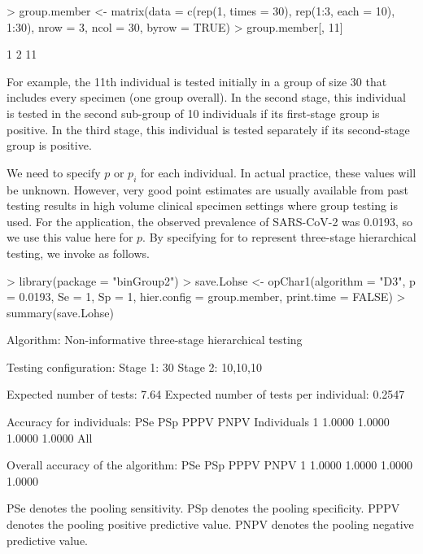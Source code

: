 \noindent 

\begin{Schunk}
\begin{Sinput}
> group.member <- matrix(data = c(rep(1, times = 30), rep(1:3, each = 10),
     1:30), nrow = 3, ncol = 30, byrow = TRUE)
> group.member[, 11]
\end{Sinput}
\begin{Soutput}
[1]  1  2 11
\end{Soutput}
\end{Schunk}

\noindent 

\noindent For example, the 11th individual is tested initially in
a group of size 30 that includes every specimen (one group overall).
In the second stage, this individual is tested in the second sub-group
of 10 individuals if its first-stage group is positive. In the third
stage, this individual is tested separately if its second-stage group
is positive.

We need to specify $p$ or $p_{i}$ for each individual. In actual
practice, these values will be unknown. However, very good point estimates
are usually available from past testing results in high volume clinical
specimen settings where group testing is used. For the \citet{lohse2020pooling}
application, the observed prevalence of SARS-CoV-2 was 0.0193, so
we use this value here for $p$. By specifying  for 
to represent three-stage hierarchical testing, we invoke 
as follows.

\noindent 

\begin{Schunk}
\begin{Sinput}
> library(package = "binGroup2")
> save.Lohse <- opChar1(algorithm = "D3", p = 0.0193, Se = 1, Sp = 1,
     hier.config = group.member, print.time = FALSE)
> summary(save.Lohse)
\end{Sinput}
\begin{Soutput}

Algorithm: Non-informative three-stage hierarchical testing 

Testing configuration:
Stage 1: 30
Stage 2: 10,10,10

Expected number of tests: 7.64
Expected number of tests per individual: 0.2547

Accuracy for individuals:
     PSe    PSp   PPPV   PNPV Individuals
1 1.0000 1.0000 1.0000 1.0000         All

Overall accuracy of the algorithm:
     PSe    PSp   PPPV   PNPV
1 1.0000 1.0000 1.0000 1.0000

PSe denotes the pooling sensitivity.
PSp denotes the pooling specificity.
PPPV denotes the pooling positive predictive value.
PNPV denotes the pooling negative predictive value.
\end{Soutput}
\end{Schunk}

